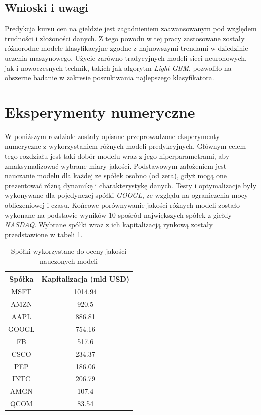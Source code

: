 \documentclass[a4paper, twoside, 11pt, openright]{article}
\begin{document}
\subsection{Wnioski i uwagi}

Predykcja kursu cen na giełdzie jest zagadnieniem zaawansowanym pod względem trudności i złożoności danych. Z tego powodu w tej pracy zastosowane zostały różnorodne modele klasyfikacyjne zgodne z najnowszymi trendami w dziedzinie uczenia maszynowego. Użycie zarówno tradycyjnych modeli sieci neuronowych, jak i nowoczesnych technik, takich jak algorytm \textit{Light GBM}, pozwoliło na obszerne badanie w zakresie poszukiwania najlepszego klasyfikatora.

\newpage

\section{Eksperymenty numeryczne}

W poniższym rozdziale zostały opisane przeprowadzone eksperymenty numeryczne z wykorzystaniem różnych modeli predykcyjnych. Głównym celem tego rozdziału jest taki dobór modelu wraz z jego hiperparametrami, aby zmaksymalizować wybrane miary jakości. Podstawowym założeniem jest nauczanie modelu dla każdej ze spółek osobno (od zera), gdyż mogą one prezentować różną dynamikę i charakterystykę danych. Testy i optymalizacje były wykonywane dla pojedynczej spółki \textit{GOOGL}, ze względu na ograniczenia mocy obliczeniowej i czasu. Końcowe porównywanie jakości różnych modeli zostało wykonane na podstawie wyników 10 spośród największych spółek z giełdy \textit{NASDAQ}. Wybrane spółki wraz z ich kapitalizacją rynkową zostały przedstawione w tabeli \ref{tab:biggest_companies}.


\begin{table}[H]
    \centering
    \begin{tabular}{|c|c|}
    \hline
        \textbf{Spółka} & \textbf{Kapitalizacja (mld USD)} \\ \hline
        MSFT & 1014.94 \\ \hline 
        AMZN & 920.5 \\ \hline 
        AAPL & 886.81 \\ \hline 
        GOOGL & 754.16 \\ \hline 
        FB & 517.6 \\ \hline 
        CSCO & 234.37 \\ \hline 
        PEP & 186.06 \\ \hline 
        INTC & 206.79 \\ \hline 
        AMGN & 107.4 \\ \hline 
        QCOM & 83.54 \\ \hline 
    \end{tabular}
    \caption{Spółki wykorzystane do oceny jakości nauczonych modeli}
    \label{tab:biggest_companies}
\end{table}
\end{document}
